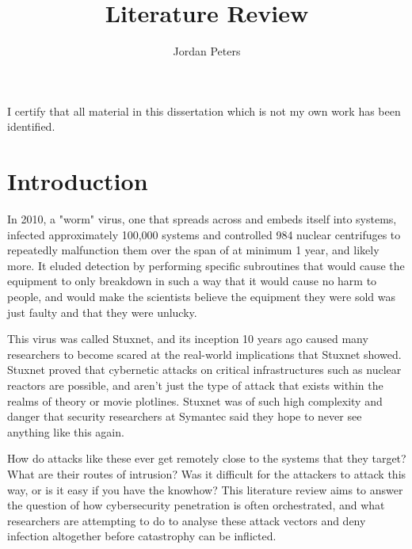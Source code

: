 \documentclass[a4paper, 11pt]{article}
\title{Literature Review}
\author{Jordan Peters}
\begin{document}
\begin{titlepage}
    \maketitle
    I certify that all material in this dissertation which is not my own work has been identified.
\end{titlepage}

\tableofcontents


\pagebreak


\section{Introduction}
In 2010, a "worm" virus, one that spreads across and embeds itself into systems, infected approximately 100,000 systems \cite{ref:stuxnet2011report} and controlled 984 nuclear centrifuges to repeatedly malfunction them \cite{ref:singer2014cybersecurity} over the span of at minimum 1 year, and likely more. \cite{ref:stuxnet2011report} It eluded detection by performing specific subroutines that would cause the equipment to only breakdown in such a way that it would cause no harm to people, and would make the scientists believe the equipment they were sold was just faulty and that they were unlucky. \cite{ref:singer2014cybersecurity}

This virus was called Stuxnet, and its inception 10 years ago caused many researchers to become scared at the real-world implications that Stuxnet showed. \cite{ref:stuxnet2011report,ref:singer2014cybersecurity} Stuxnet proved that cybernetic attacks on critical infrastructures such as nuclear reactors are possible, and aren't just the type of attack that exists within the realms of theory or movie plotlines. \cite{ref:stuxnet2011report} Stuxnet was of such high complexity and danger that security researchers at Symantec said they hope to never see anything like this again. \cite{ref:stuxnet2011report}

How do attacks like these ever get remotely close to the systems that they target? What are their routes of intrusion? Was it difficult for the attackers to attack this way, or is it easy if you have the knowhow? This literature review aims to answer the question of how cybersecurity penetration is often orchestrated, and what researchers are attempting to do to analyse these attack vectors and deny infection altogether before catastrophy can be inflicted.
\end{document}
